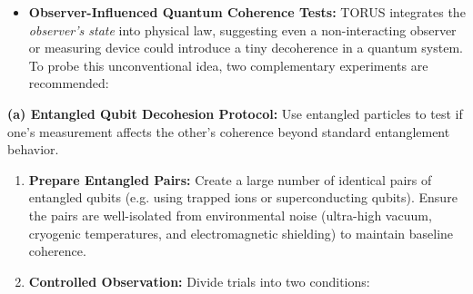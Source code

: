 \documentclass[
]{article}
\begin{document}
{\begin{itemize}
\item
  \textbf{Observer-Influenced Quantum Coherence Tests:} TORUS integrates
  the \emph{observer's state} into physical law, suggesting even a
  non-interacting observer or measuring device could introduce a tiny
  decoherence in a quantum system\hspace{0pt}. To probe this
  unconventional idea, two complementary experiments are recommended:
\end{itemize}

\textbf{(a) Entangled Qubit Decohesion Protocol:} Use entangled
particles to test if one's measurement affects the other's coherence
beyond standard entanglement behavior.

\begin{enumerate}
\def\labelenumi{\arabic{enumi}.}
\item
  \textbf{Prepare Entangled Pairs:} Create a large number of identical
  pairs of entangled qubits (e.g. using trapped ions or superconducting
  qubits). Ensure the pairs are well-isolated from environmental noise
  (ultra-high vacuum, cryogenic temperatures, and electromagnetic
  shielding) to maintain baseline coherence.
\item
  \textbf{Controlled Observation:} Divide trials into two conditions:


\end{enumerate}}
\end{document}
